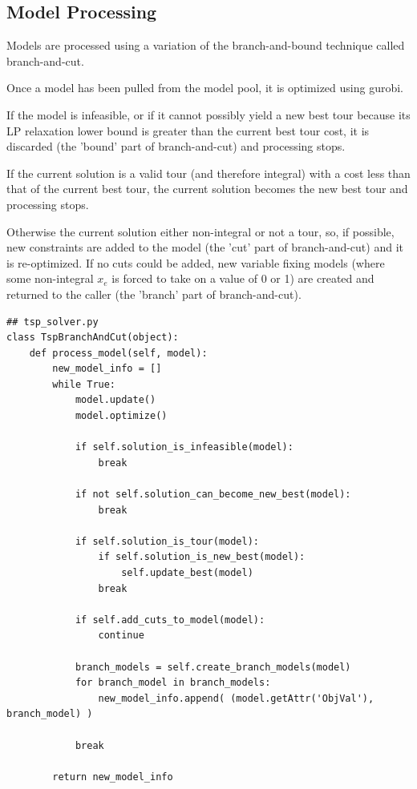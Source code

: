 \documentclass{article}
\begin{document}
\subsection{Model Processing}
\begin{flushleft}

Models are processed
using a variation
of the branch-and-bound
technique
called branch-and-cut.

Once a model has been pulled
from the model pool,
it is optimized using gurobi.

If the model is infeasible,
or if it cannot possibly yield a new best tour
because its LP relaxation lower bound
is greater than the current best tour cost,
it is discarded
(the 'bound' part of branch-and-cut)
and processing stops.

If the current solution
is a valid tour
(and therefore integral)
with a cost less than that
of the current best tour,
the current solution becomes the new best tour
and processing stops.

Otherwise the current solution
either non-integral or not a tour,
so, if possible, new constraints
are added to the model
(the 'cut' part of branch-and-cut)
and it is re-optimized.
If no cuts could be added,
new variable fixing models
(where some non-integral $x_e$
is forced to take on a value of 0 or 1)
are created
and returned to the caller
(the 'branch' part of branch-and-cut).

\begin{lstlisting}
## tsp_solver.py
class TspBranchAndCut(object):
    def process_model(self, model):
        new_model_info = []
        while True:
            model.update()
            model.optimize()

            if self.solution_is_infeasible(model):
                break

            if not self.solution_can_become_new_best(model):
                break

            if self.solution_is_tour(model):
                if self.solution_is_new_best(model):
                    self.update_best(model)
                break

            if self.add_cuts_to_model(model):
                continue

            branch_models = self.create_branch_models(model)
            for branch_model in branch_models:
                new_model_info.append( (model.getAttr('ObjVal'), branch_model) )

            break

        return new_model_info
\end{lstlisting}

\end{flushleft}
\end{document}
